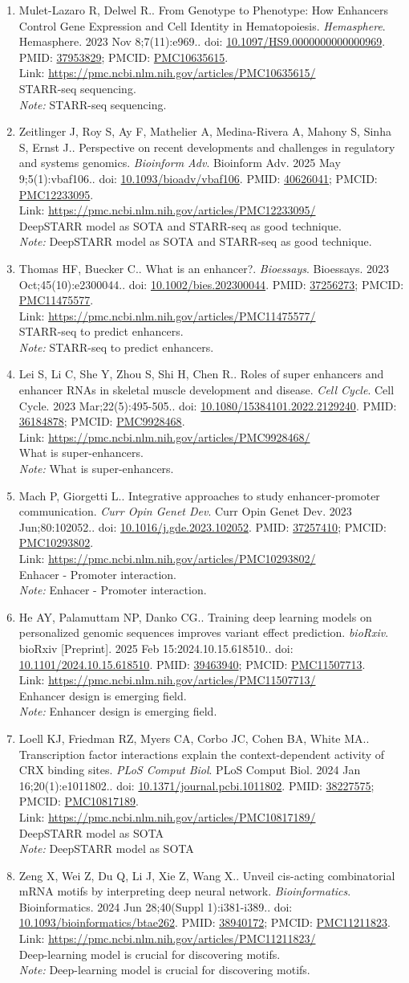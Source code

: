 \documentclass[12pt]{article}
\newcommand{\Pub}[9]{%
  \item #1. #2. \textit{#3}. #4. doi: \href{https://doi.org/#5}{#5}. PMID: \href{https://pubmed.ncbi.nlm.nih.gov/#6/}{#6}; PMCID: \href{https://www.ncbi.nlm.nih.gov/pmc/articles/#7/}{#7}. \\
  \noindent Link: \url{#8}\\
  \ifx#9\relax\else\\\textit{Note:} #9\fi
}
\begin{document}
\begin{enumerate}[leftmargin=*,label=\textbf{\arabic*.}]
\Pub{Mulet-Lazaro R, Delwel R.}{From Genotype to Phenotype: How Enhancers Control Gene Expression and Cell Identity in Hematopoiesis}{Hemasphere}{Hemasphere. 2023 Nov 8;7(11):e969.}{10.1097/HS9.0000000000000969}{37953829}{PMC10635615}{https://pmc.ncbi.nlm.nih.gov/articles/PMC10635615/}{STARR-seq sequencing.}

\Pub{Zeitlinger J, Roy S, Ay F, Mathelier A, Medina-Rivera A, Mahony S, Sinha S, Ernst J.}{Perspective on recent developments and challenges in regulatory and systems genomics}{Bioinform Adv}{Bioinform Adv. 2025 May 9;5(1):vbaf106.}{10.1093/bioadv/vbaf106}{40626041}{PMC12233095}{https://pmc.ncbi.nlm.nih.gov/articles/PMC12233095/}{DeepSTARR model as SOTA and STARR-seq as good technique.}

\Pub{Thomas HF, Buecker C.}{What is an enhancer?}{Bioessays}{Bioessays. 2023 Oct;45(10):e2300044.}{10.1002/bies.202300044}{37256273}{PMC11475577}{https://pmc.ncbi.nlm.nih.gov/articles/PMC11475577/}{STARR-seq to predict enhancers.}

\Pub{Lei S, Li C, She Y, Zhou S, Shi H, Chen R.}{Roles of super enhancers and enhancer RNAs in skeletal muscle development and disease}{Cell Cycle}{Cell Cycle. 2023 Mar;22(5):495-505.}{10.1080/15384101.2022.2129240}{36184878}{PMC9928468}{https://pmc.ncbi.nlm.nih.gov/articles/PMC9928468/}{What is super-enhancers.}

\Pub{Mach P, Giorgetti L.}{Integrative approaches to study enhancer-promoter communication}{Curr Opin Genet Dev}{Curr Opin Genet Dev. 2023 Jun;80:102052.}{10.1016/j.gde.2023.102052}{37257410}{PMC10293802}{https://pmc.ncbi.nlm.nih.gov/articles/PMC10293802/}{Enhacer - Promoter interaction.}

\Pub{He AY, Palamuttam NP, Danko CG.}{Training deep learning models on personalized genomic sequences improves variant effect prediction}{bioRxiv}{bioRxiv [Preprint]. 2025 Feb 15:2024.10.15.618510.}{10.1101/2024.10.15.618510}{39463940}{PMC11507713}{https://pmc.ncbi.nlm.nih.gov/articles/PMC11507713/}{Enhancer design is emerging field.}

\Pub{Loell KJ, Friedman RZ, Myers CA, Corbo JC, Cohen BA, White MA.}{Transcription factor interactions explain the context-dependent activity of CRX binding sites}{PLoS Comput Biol}{PLoS Comput Biol. 2024 Jan 16;20(1):e1011802.}{10.1371/journal.pcbi.1011802}{38227575}{PMC10817189}{https://pmc.ncbi.nlm.nih.gov/articles/PMC10817189/}{DeepSTARR model as SOTA }

\Pub{Zeng X, Wei Z, Du Q, Li J, Xie Z, Wang X.}{Unveil cis-acting combinatorial mRNA motifs by interpreting deep neural network}{Bioinformatics}{Bioinformatics. 2024 Jun 28;40(Suppl 1):i381-i389.}{10.1093/bioinformatics/btae262}{38940172}{PMC11211823}{https://pmc.ncbi.nlm.nih.gov/articles/PMC11211823/}{Deep-learning model is crucial for discovering motifs.}


\end{enumerate}
\end{document}
